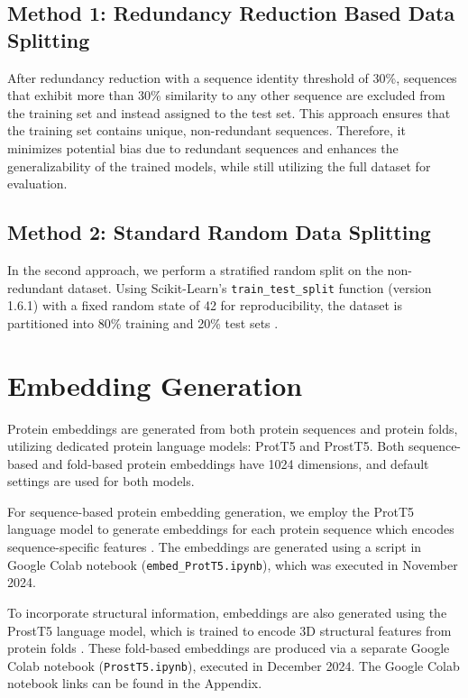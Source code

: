\subsection{Method 1: Redundancy Reduction Based Data Splitting}

After redundancy reduction with a sequence identity threshold of 30\%, sequences that exhibit more than 30\% similarity to any other sequence are excluded from the training set and instead assigned to the test set.
This approach ensures that the training set contains unique, non-redundant sequences.
Therefore, it minimizes potential bias due to redundant sequences and enhances the generalizability of the trained models, while still utilizing the full dataset for evaluation.

\subsection{Method 2: Standard Random Data Splitting}

In the second approach, we perform a stratified random split on the non-redundant dataset.
Using Scikit-Learn’s \texttt{train\_test\_split} function (version 1.6.1) with a fixed random state of 42 for reproducibility, the dataset is partitioned into 80\% training and 20\% test sets \cite{pedregosa2011scikit}.

\section{Embedding Generation}
\label{section:embedding_generation}

Protein embeddings are generated from both protein sequences and protein folds, utilizing dedicated protein language models: \gls{ProtT5} and \gls{ProstT5}.
Both sequence-based and fold-based protein embeddings have 1024 dimensions, and default settings are used for both models.

For sequence-based protein embedding generation, we employ the \gls{ProtT5} language model to generate embeddings for each protein sequence which encodes sequence-specific features \cite{elnaggar2021prottrans}.
The embeddings are generated using a script in Google Colab notebook (\texttt{embed\_ProtT5.ipynb}), which was executed in November 2024.

To incorporate structural information, embeddings are also generated using the \gls{ProstT5} language model, which is trained to encode 3D structural features from protein folds \cite{heinzinger2023prostt5}.
These fold-based embeddings are produced via a separate Google Colab notebook (\texttt{ProstT5.ipynb}), executed in December 2024. The Google Colab notebook links can be found in the Appendix.


